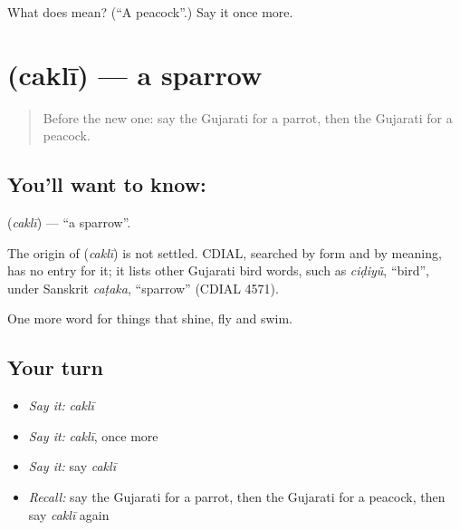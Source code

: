 \begin{tcolorbox}[breakable,colback=teal!4,colframe=teal!35!black,title={Before you move on}]
What does  mean? (\textquotedblleft{}A peacock\textquotedblright{}.) Say it once more.
\end{tcolorbox}
\section[\texorpdfstring{\gu{ચકલી} (caklī)}{ચકલી (caklī)}]{ (caklī) — a sparrow}

\label{lesson:GU-C69-sparrow}



\begin{quote}
Before the new one: say the Gujarati for a parrot, then the Gujarati for a peacock.
\end{quote}

\subsection*{You'll want to know: }
\textbf{} (\emph{caklī}) — \textquotedblleft{}a sparrow\textquotedblright{}.

\begin{cousinweb}
The origin of \textbf{} (\emph{caklī}) is not settled. CDIAL, searched by form and by meaning, has no entry for it; it lists other Gujarati bird words, such as \emph{ciḍiyũ}, \textquotedblleft{}bird\textquotedblright{}, under Sanskrit \emph{caṭaka}, \textquotedblleft{}sparrow\textquotedblright{} (CDIAL 4571).
\end{cousinweb}

\begin{grammarlens}[title={What you've built}]
One more word for things that shine, fly and swim.
\end{grammarlens}

\subsection*{Your turn}
\begin{itemize}
\raggedright
  \item \emph{Say it:} \emph{caklī}
  \item \emph{Say it:} \emph{caklī}, once more
  \item \emph{Say it:} say \emph{caklī}
  \item \emph{Recall:} say the Gujarati for a parrot, then the Gujarati for a peacock, then say \emph{caklī} again
\end{itemize}

